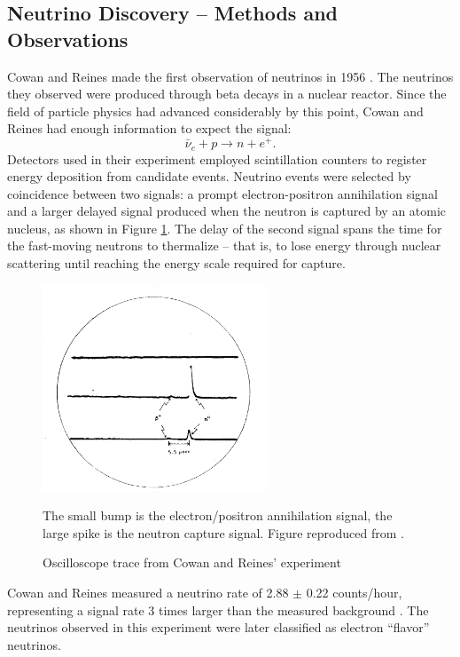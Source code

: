 \subsection{Neutrino Discovery -- Methods and Observations}
\label{discovery}


Cowan and Reines made the first observation of neutrinos in 1956
\cite{cowanNature}.
The neutrinos they observed were produced through beta decays in a nuclear
reactor.  Since the field of particle physics had advanced considerably by this
point, Cowan and Reines had enough information to expect the signal:
\begin{equation} \label{beta} \bar{\nu}_e + p \rightarrow n + e^+.  \end{equation}
Detectors used in their experiment employed scintillation counters to register
energy deposition from candidate events.  Neutrino events were selected by
coincidence between two signals:
a prompt electron-positron annihilation signal
and a larger delayed signal produced when the neutron is captured by an atomic
nucleus, as shown in Figure \ref{oscilloscope}.
The delay of the second signal spans the time for the fast-moving neutrons to
thermalize -- that is, to lose energy through nuclear scattering until reaching
the energy scale required for capture.

\begin{figure}
  \begin{center}
    \includegraphics[width=0.6\textwidth]{figures/figures/cowanOscilloscope.png}
  \end{center}
  \caption{Oscilloscope trace from Cowan and Reines' experiment}{ The small
  bump is the electron/positron annihilation signal, the large spike is the
  neutron capture signal.  Figure reproduced from \cite{cowanNature}.}
  \label{oscilloscope}
\end{figure}
Cowan and Reines measured a neutrino rate of 2.88 $\pm$ 0.22 counts/hour,
representing a signal rate 3 times larger than the measured background
 \cite{cowan}.
The neutrinos observed in this experiment were later classified as
electron ``flavor''  neutrinos.

